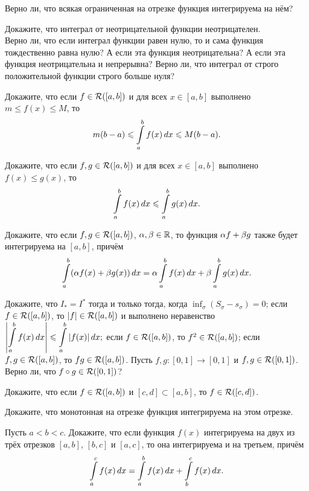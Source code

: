 \documentclass[a4paper,12pt]{article}
\newcommand{\Rim}[2]{{\cal R}([#1,#2])}
\newcommand{\RimAB}{\Rim {a}{b}}
\begin{document}
Верно ли, что всякая ограниченная на отрезке функция интегрируема на нём?

 Докажите, что интеграл от неотрицательной функции неотрицателен.\\
 Верно ли, что если интеграл функции равен нулю, то и сама функция тождественно равна нулю?
 А если эта функция неотрицательна?
 А если эта функция неотрицательна и непрерывна?
 Верно ли, что интеграл от строго положительной функции строго больше нуля?

Докажите, что если $f\in\RimAB$ и для всех $x\in[a,b]$ выполнено $m\le f(x)\le M$, то
\vskip -4mm
$$
m(b-a) \leqslant \int\limits_{{a}}^{{b}}f(x)\,dx \leqslant M(b-a).
$$
\vskip -1mm

Докажите, что если $f,g\in\RimAB$ и для всех $x\in[a,b]$ выполнено $f(x)\le g(x)$, то
\vskip -4mm
$$
\int\limits_{{a}}^{{b}} f(x)\,dx \leqslant \int\limits_{{a}}^{{b}} g(x)\,dx.
$$
\vskip -1mm

\vfill
{}
\newpage



Докажите, что если $f,g\in\RimAB$, $\alpha,\beta\in\mathbb{R}$, то функция $\alpha f+\beta g$ также будет интегрируема на $[a,b]$, причём
\vskip -4mm
$$
\int\limits_{{a}}^{{b}}(\alpha f(x)+ \beta g(x))\,dx = \alpha\int\limits_{{a}}^{{b}}f(x)\,dx + \beta\int\limits_{{a}}^{{b}}g(x)\,dx.
$$
\vskip -1mm





Докажите, что
$I_*=I^*$ тогда и только тогда, когда $\inf_{\sigma} (S_\sigma-s_\sigma) = 0$;
если $f \in \RimAB$, то $|f|\in \RimAB$ и выполнено неравенство
$
\displaystyle
\left|\int\limits_{{a}}^{{b}}f(x)\,dx\right| \leqslant \int\limits_{{a}}^{{b}}|f(x)|\,dx;
$
если $f \in \RimAB$, то $f^2 \in \RimAB$;
\smallskip
{}
если $f,g \in \RimAB$, то $fg \in \RimAB$.
\smallskip
{}
Пусть $f,g \colon [0,1] \to [0,1]$ и $f,g \in \Rim01$. Верно ли, что $f\circ g \in \Rim01$?

\smallskip
{}
Докажите, что если $f\in\RimAB$ и $[c,d]\subset [a,b]$, то $f\in\Rim{c}{d}$.


Докажите, что монотонная на отрезке функция интегрируема на этом отрезке.


Пусть $a<b<c$. Докажите, что если функция $f(x)$ интегрируема на двух из трёх отрезков $[a,b]$, $[b,c]$ и $[a,c]$, то она интегрируема и на третьем, причём
\vskip -4mm
$$
\int\limits_{{a}}^{{c}} f(x)\,dx = \int\limits_{{a}}^{{b}} f(x)\,dx + \int\limits_{{b}}^{{c}} f(x)\,dx.
$$
\vskip -7mm
\end{document}
